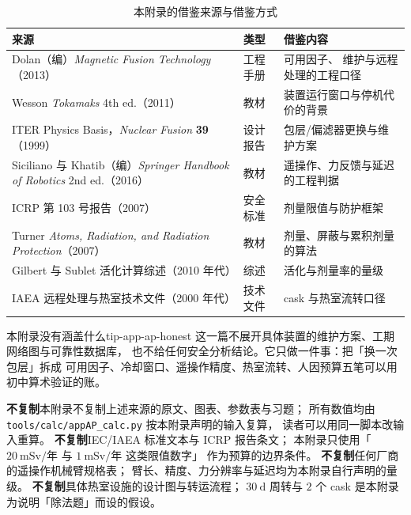 \begin{table}[htbp]
\centering
\small
\caption{本附录的借鉴来源与借鉴方式}
\label{tab:app-ap-source}
\setlength{\tabcolsep}{4pt}
\begin{tabular}{p{5.2cm}p{3.4cm}p{6.4cm}}
\toprule
来源 & 类型 & 借鉴内容 \\
\midrule
Dolan（编）\textit{Magnetic Fusion Technology}（2013） & 工程手册 & 可用因子、
维护与远程处理的工程口径 \\
Wesson \textit{Tokamaks} 4th ed.（2011） & 教材 & 装置运行窗口与停机代价的背景 \\
ITER Physics Basis，\textit{Nuclear Fusion} \textbf{39}（1999） & 设计报告 &
包层/偏滤器更换与维护方案 \\
Siciliano 与 Khatib（编）\textit{Springer Handbook of Robotics} 2nd ed.（2016） &
教材 & 遥操作、力反馈与延迟的工程判据 \\
ICRP 第 103 号报告（2007） & 安全标准 & 剂量限值与防护框架 \\
Turner \textit{Atoms, Radiation, and Radiation Protection}（2007） &
教材 & 剂量、屏蔽与累积剂量的算法 \\
Gilbert 与 Sublet 活化计算综述（2010 年代） & 综述 & 活化与剂量率的量级 \\
IAEA 远程处理与热室技术文件（2000 年代） & 技术文件 & cask 与热室流转口径 \\
\bottomrule
\end{tabular}
\end{table}

\begin{tip}{本附录没有涵盖什么}{tip-app-ap-honest}
这一篇不展开具体装置的维护方案、工期网络图与可靠性数据库，
也不给任何安全分析结论。它只做一件事：把「换一次包层」拆成
可用因子、冷却窗口、遥操作精度、热室流转、人因预算五笔可以用初中算术验证的账。
\end{tip}

\textbf{不复制}本附录不复制上述来源的原文、图表、参数表与习题；
所有数值均由 \texttt{tools/\allowbreak{}calc/\allowbreak{}appAP\_calc.py} 按本附录声明的输入复算，
读者可以用同一脚本改输入重算。
\textbf{不复制}IEC/IAEA 标准文本与 ICRP 报告条文；
本附录只使用「$20\ \mathrm{mSv}/$年 与 $1\ \mathrm{mSv}/$年 这类限值数字」
作为预算的边界条件。
\textbf{不复制}任何厂商的遥操作机械臂规格表；
臂长、精度、力分辨率与延迟均为本附录自行声明的量级。
\textbf{不复制}具体热室设施的设计图与转运流程；
$30\ \mathrm{d}$ 周转与 $2$ 个 cask 是本附录为说明「除法题」而设的假设。
\endgroup
